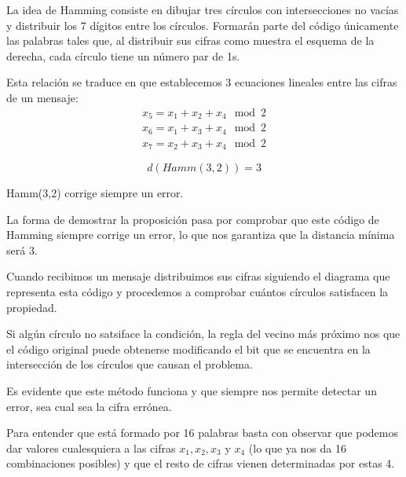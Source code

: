 \begin{minipage}{0.57\textwidth}
La idea de Hamming consiste en dibujar tres círculos con intersecciones no vacías y distribuir los 7 dígitos entre los círculos. Formarán parte del código únicamente las palabras tales que, al distribuir sus cifras como muestra el esquema de la derecha, cada círculo tiene un número par de 1s.
\end{minipage}
\begin{minipage}{0.42\textwidth}
\begin{center}
\end{center}
\end{minipage}

Esta relación se traduce en que establecemos 3 ecuaciones lineales entre las cifras de un mensaje:
\[\begin{array}{l}x_5=x_1+x_2+x_4 \mod 2 \\ x_6=x_1+x_3+x_4 \mod 2 \\ x_7=x_2+x_3+x_4 \mod 2 \end{array}\]

\begin{prop}
\[d(Hamm(3,2))=3\]
\end{prop}
\begin{corol}
Hamm(3,2) corrige siempre un error.
\end{corol}

La forma de demostrar la proposición pasa por comprobar que este código de Hamming siempre corrige un error, lo que nos garantiza que la distancia mínima será 3.

Cuando recibimos un mensaje distribuimos sus cifras siguiendo el diagrama que representa esta código y procedemos a comprobar cuántos círculos satisfacen la propiedad.

Si algún círculo no satsiface la condición, la regla del vecino más próximo nos que el código original puede obtenerse modificando el bit que se encuentra en la intersección de los círculos que causan el problema.

Es evidente que este método funciona y que siempre nos permite detectar un error, sea cual sea la cifra errónea.

Para entender que está formado por 16 palabras basta con observar que podemos dar valores cualesquiera a las cifras $x_1,x_2,x_3$ y $x_4$ (lo que ya nos da 16 combinaciones posibles) y que el resto de cifras vienen determinadas por estas 4.
